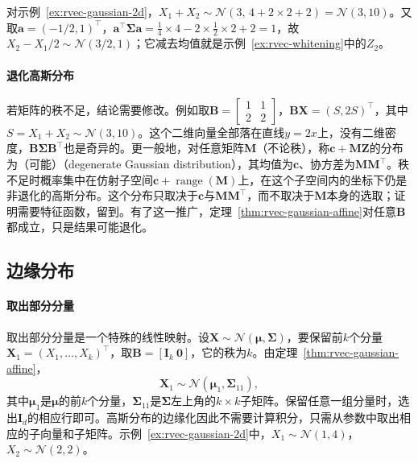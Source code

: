 对示例~\ref{ex:rvec-gaussian-2d}，$X_1+X_2\sim\mathcal N(3,\,4+2\times2+2)=\mathcal N(3,10)$。又取$\bm a=(-1/2,1)^{\top}$，$\bm a^{\top}\bm\Sigma\bm a=\frac14\times4-2\times\frac12\times2+2=1$，故$X_2-X_1/2\sim\mathcal N(3/2,1)$；它减去均值就是示例~\ref{ex:rvec-whitening}中的$Z_2$。

\paragraph{退化高斯分布}
若矩阵的秩不足，结论需要修改。例如取$\bm B=\begin{bmatrix}1&1\\2&2\end{bmatrix}$，$\bm B\bm X=(S,2S)^{\top}$，其中$S=X_1+X_2\sim\mathcal N(3,10)$。这个二维向量全部落在直线$y=2x$上，没有二维密度，$\bm B\bm\Sigma\bm B^{\top}$也是奇异的。更一般地，对任意矩阵$\bm M$（不论秩），称$\bm c+\bm M\bm Z$的分布为（可能）（degenerate Gaussian distribution），其均值为$\bm c$、协方差为$\bm M\bm M^{\top}$。秩不足时概率集中在仿射子空间$\bm c+\operatorname{range}(\bm M)$上，在这个子空间内的坐标下仍是非退化的高斯分布。这个分布只取决于$\bm c$与$\bm M\bm M^{\top}$，而不取决于$\bm M$本身的选取；证明需要特征函数，留到。有了这一推广，定理~\ref{thm:rvec-gaussian-affine}对任意$\bm B$都成立，只是结果可能退化。

\subsection{边缘分布}

\paragraph{取出部分分量}
取出部分分量是一个特殊的线性映射。设$\bm X\sim\mathcal N(\bm\mu,\bm\Sigma)$，要保留前$k$个分量$\bm X_1=(X_1,\ldots,X_k)^{\top}$，取$\bm B=[\bm I_k\ \bm0]$，它的秩为$k$。由定理~\ref{thm:rvec-gaussian-affine}，
\[
 \bm X_1\sim\mathcal N(\bm\mu_1,\bm\Sigma_{11}),
\]
其中$\bm\mu_1$是$\bm\mu$的前$k$个分量，$\bm\Sigma_{11}$是$\bm\Sigma$左上角的$k\times k$子矩阵。保留任意一组分量时，选出$\bm I_d$的相应行即可。高斯分布的边缘化因此不需要计算积分，只需从参数中取出相应的子向量和子矩阵。示例~\ref{ex:rvec-gaussian-2d}中，$X_1\sim\mathcal N(1,4)$，$X_2\sim\mathcal N(2,2)$。

